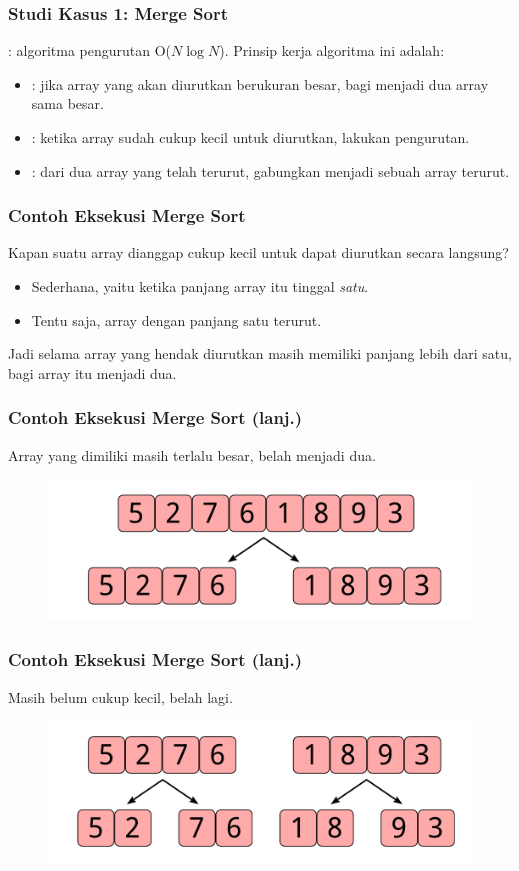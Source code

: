 \begin{frame}
\frametitle{Studi Kasus 1: Merge Sort}
: algoritma pengurutan O($N \log{N}$).
\newline
\newline
Prinsip kerja algoritma ini adalah:
\begin{itemize}
  \item {}: jika array yang akan diurutkan berukuran besar, bagi menjadi dua array sama besar.
  \item {}: ketika array sudah cukup kecil untuk diurutkan, lakukan pengurutan.
  \item {}: dari dua array yang telah terurut, gabungkan menjadi sebuah array terurut.
\end{itemize}
\end{frame}

\begin{frame}
\frametitle{Contoh Eksekusi Merge Sort}
Kapan suatu array dianggap cukup kecil untuk dapat diurutkan secara langsung?
\newline
\begin{itemize}
  \item Sederhana, yaitu ketika panjang array itu tinggal \emph{satu}.
  \item Tentu saja, array dengan panjang satu  terurut.
  \newline
\end{itemize}
Jadi selama array yang hendak diurutkan masih memiliki panjang lebih dari satu, bagi array itu menjadi dua.
\end{frame}

\begin{frame}
\frametitle{Contoh Eksekusi Merge Sort (lanj.)}
Array yang dimiliki masih terlalu besar, belah menjadi dua.
\begin{figure}
  \centering
  \includegraphics[width=10 cm]{asset/merge-sort-demo-1.pdf}
\end{figure}
\end{frame}

\begin{frame}
\frametitle{Contoh Eksekusi Merge Sort (lanj.)}
Masih belum cukup kecil, belah lagi.
\begin{figure}
  \centering
  \includegraphics[width=10 cm]{asset/merge-sort-demo-2.pdf}
\end{figure}
\end{frame}

